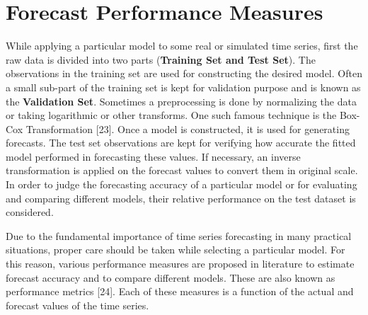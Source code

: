 \section{Forecast Performance Measures}

While applying a particular model to some real or simulated time series, first the raw data is divided into two parts (\textbf{Training Set and
	Test Set}). The observations in the training set are used for constructing the desired model. Often a small sub-part of the training
set is kept for validation purpose and is known as the \textbf{Validation Set}. Sometimes a preprocessing is done by normalizing the data or taking logarithmic or other transforms. One such famous technique is the Box-Cox Transformation {[}23{]}. Once a model is constructed, it is used for generating forecasts. The test set observations are kept for verifying how accurate the fitted model performed in forecasting these values. If necessary, an inverse transformation is applied on the forecast values to convert them in original scale. In order to judge the forecasting accuracy of a particular model or for evaluating and comparing different models, their relative performance on the test dataset is considered.

Due to the fundamental importance of time series forecasting in many practical situations, proper care should be taken while selecting a particular model. For this reason, various performance measures are proposed in literature to estimate forecast accuracy and to compare different models. These are also known as performance metrics {[}24{]}. Each of these measures is a function of the actual and forecast values of the time series.

